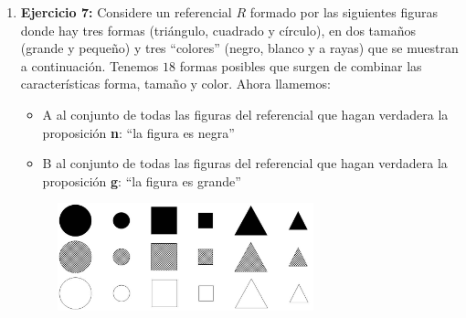 \documentclass[12pt]{article}
\theoremstyle{definition}
\theoremstyle{remark}
\begin{document}
\begin{enumerate}
\item \textbf{Ejercicio 7:} Considere un referencial $R$ formado por las siguientes figuras donde hay tres formas (triángulo, cuadrado y círculo), en dos tamaños (grande y pequeño) y  tres “colores” (negro, blanco y a rayas) que se muestran a continuación. Tenemos $18$ formas posibles que surgen de combinar las características forma, tamaño y color.  Ahora llamemos:
\begin{itemize}
\item A al conjunto de todas las figuras del referencial que hagan verdadera la proposición \textbf{n}: “la figura es negra”
\item B al conjunto de todas las figuras del referencial que hagan verdadera la proposición \textbf{g}: “la figura es grande” 
\end{itemize}
\begin{figure}[H]
\centering
\includegraphics[width=0.7\textwidth]{TP1Fig1}
\end{figure}


\end{enumerate}
\end{document}
